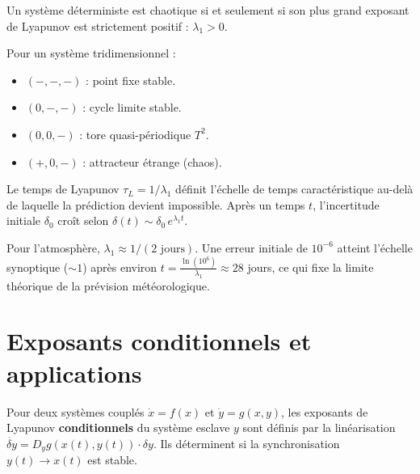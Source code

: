 \begin{proposition}
Un syst\`eme d\'eterministe est chaotique si et seulement si son plus grand
exposant de Lyapunov est strictement positif : $\lambda_1 > 0$.
\end{proposition}

\begin{exemple}
Pour un syst\`eme tridimensionnel :
\begin{itemize}
    \item $(-, -, -)$ : point fixe stable.
    \item $(0, -, -)$ : cycle limite stable.
    \item $(0, 0, -)$ : tore quasi-p\'eriodique $T^2$.
    \item $(+, 0, -)$ : attracteur \'etrange (chaos).
\end{itemize}
\end{exemple}

\begin{lemme}
Le temps de Lyapunov $\tau_L = 1/\lambda_1$ d\'efinit l'\'echelle de temps
caract\'eristique au-del\`a de laquelle la pr\'ediction devient impossible.
Apr\`es un temps $t$, l'incertitude initiale $\delta_0$ cro\^it selon
$\delta(t) \sim \delta_0 \, e^{\lambda_1 t}$.
\end{lemme}

\begin{exemple}
Pour l'atmosph\`ere, $\lambda_1 \approx 1/(2\text{ jours})$. Une erreur initiale
de $10^{-6}$ atteint l'\'echelle synoptique ($\sim 1$) apr\`es environ
$t = \frac{\ln(10^6)}{\lambda_1} \approx 28$ jours, ce qui fixe la limite
th\'eorique de la pr\'evision m\'et\'eorologique.
\end{exemple}

\section{Exposants conditionnels et applications}

\begin{definition}
Pour deux syst\`emes coupl\'es $\dot{x} = f(x)$ et $\dot{y} = g(x, y)$,
les exposants de Lyapunov \textbf{conditionnels} du syst\`eme esclave $y$
sont d\'efinis par la lin\'earisation
$\dot{\delta y} = D_y g(x(t), y(t)) \cdot \delta y$.
Ils d\'eterminent si la synchronisation $y(t) \to x(t)$ est stable.
\end{definition}

